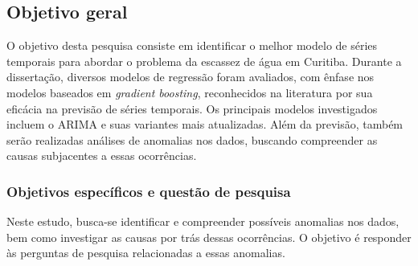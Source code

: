 \subsection{Objetivo geral} \label{subsec:objetivos}

O objetivo desta pesquisa consiste em identificar o melhor modelo de séries temporais para abordar o problema da escassez de água em Curitiba. Durante a dissertação, diversos modelos de regressão foram avaliados, com ênfase nos modelos baseados em \textit{gradient boosting}, reconhecidos na literatura por sua eficácia na previsão de séries temporais. Os principais modelos investigados incluem o ARIMA e suas variantes mais atualizadas. Além da previsão, também serão realizadas análises de anomalias nos dados, buscando compreender as causas subjacentes a essas ocorrências.
 
    
    
    \subsubsection{Objetivos espec\'ificos e quest\~ao de pesquisa} \label{subsubsec:obespec}
    
Neste estudo, busca-se identificar e compreender possíveis anomalias nos dados, bem como investigar as causas por trás dessas ocorrências. O objetivo é responder às perguntas de pesquisa relacionadas a essas anomalias.

